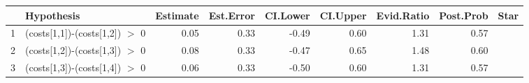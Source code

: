 \begin{table}[ht]
\centering
\begin{tabular}{rlrrrrrrl}
  \hline
 & Hypothesis & Estimate & Est.Error & CI.Lower & CI.Upper & Evid.Ratio & Post.Prob & Star \\ 
  \hline
1 & (costs[1,1])-(costs[1,2]) $>$ 0 & 0.05 & 0.33 & -0.49 & 0.60 & 1.31 & 0.57 &  \\ 
  2 & (costs[1,2])-(costs[1,3]) $>$ 0 & 0.08 & 0.33 & -0.47 & 0.65 & 1.48 & 0.60 &  \\ 
  3 & (costs[1,3])-(costs[1,4]) $>$ 0 & 0.06 & 0.33 & -0.50 & 0.60 & 1.31 & 0.57 &  \\ 
   \hline
\end{tabular}
\end{table}
